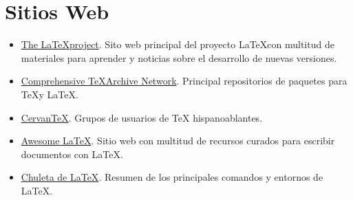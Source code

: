 \documentclass[
  a4paper,
]{scrreport}
\providecommand{\tightlist}{%
  \setlength{\itemsep}{0pt}\setlength{\parskip}{0pt}}\usepackage{longtable,booktabs,array}
\theoremstyle{definition}
\theoremstyle{remark}
\begin{document}
\section*{Sitios Web}\label{sitios-web}


\begin{itemize}
\tightlist
\item
  \href{https://www.latex-project.org/}{The \LaTeX project}. Sito web
  principal del proyecto \LaTeX con multitud de materiales para aprender
  y noticias sobre el desarrollo de nuevas versiones.
\item
  \href{https://ctan.org/}{Comprehensive \TeX Archive Network}.
  Principal repositorios de paquetes para \TeX y \LaTeX.
\item
  \href{www.cervantex.es/}{CervanTeX}. Grupos de usuarios de TeX
  hispanoablantes.
\item
  \href{https://project-awesome.org/egeerardyn/awesome-LaTeX}{Awesome
  LaTeX}. Sitio web con multitud de recursos curados para escribir
  documentos con \LaTeX.
\item
  \href{chulatex.pdf}{Chuleta de \LaTeX}. Resumen de los principales
  comandos y entornos de \LaTeX.
\end{itemize}
\end{document}
